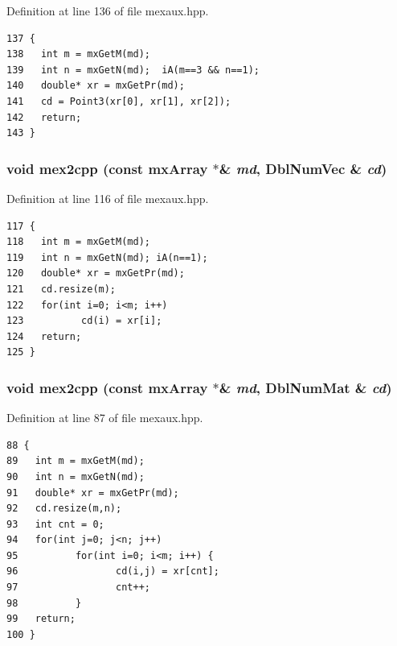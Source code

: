 Definition at line 136 of file mexaux.hpp.

\footnotesize\begin{verbatim}137 {
138   int m = mxGetM(md);
139   int n = mxGetN(md);  iA(m==3 && n==1);
140   double* xr = mxGetPr(md);
141   cd = Point3(xr[0], xr[1], xr[2]);
142   return;
143 }
\end{verbatim}\normalsize 


\subsubsection{\setlength{\rightskip}{0pt plus 5cm}void mex2cpp (const mx\-Array $\ast$\& {\em md}, Dbl\-Num\-Vec \& {\em cd})\hspace{0.3cm}{\tt  [inline]}}\label{mexaux_8hpp_ad8b035ec7d3820dfb22defbbe76526c_ad8b035ec7d3820dfb22defbbe76526c}




Definition at line 116 of file mexaux.hpp.

\footnotesize\begin{verbatim}117 {
118   int m = mxGetM(md);
119   int n = mxGetN(md); iA(n==1);
120   double* xr = mxGetPr(md);
121   cd.resize(m);
122   for(int i=0; i<m; i++)
123          cd(i) = xr[i];
124   return;
125 }
\end{verbatim}\normalsize 


\subsubsection{\setlength{\rightskip}{0pt plus 5cm}void mex2cpp (const mx\-Array $\ast$\& {\em md}, Dbl\-Num\-Mat \& {\em cd})\hspace{0.3cm}{\tt  [inline]}}\label{mexaux_8hpp_2e24b4bbbb930aa235f53e2f5ae51e93_2e24b4bbbb930aa235f53e2f5ae51e93}




Definition at line 87 of file mexaux.hpp.

\footnotesize\begin{verbatim}88 {
89   int m = mxGetM(md);
90   int n = mxGetN(md);
91   double* xr = mxGetPr(md);
92   cd.resize(m,n);
93   int cnt = 0;
94   for(int j=0; j<n; j++)
95          for(int i=0; i<m; i++) {
96                 cd(i,j) = xr[cnt];
97                 cnt++;
98          }
99   return;
100 }
\end{verbatim}\normalsize 


